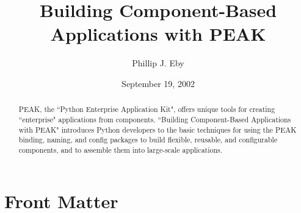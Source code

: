\documentclass{manual}
\title{Building Component-Based \\ Applications with PEAK}
\author{Phillip J. Eby}
\date{September 19, 2002}       %
\begin{document}
\maketitle

\ifhtml
\chapter*{Front Matter\label{front}}
\fi

%

\begin{abstract}

\noindent

PEAK, the ``Python Enterprise Application Kit", offers unique tools for
creating ``enterprise" applications from components.  ``Building
Component-Based Applications with PEAK" introduces Python developers to
the basic techniques for using the PEAK binding, naming, and config
packages to build flexible, reusable, and configurable components, and
to assemble them into large-scale applications.

\end{abstract}

\tableofcontents





%

%












%
%
%
\renewcommand{\indexname}{Module Index}

\renewcommand{\indexname}{Index}
\end{document}
